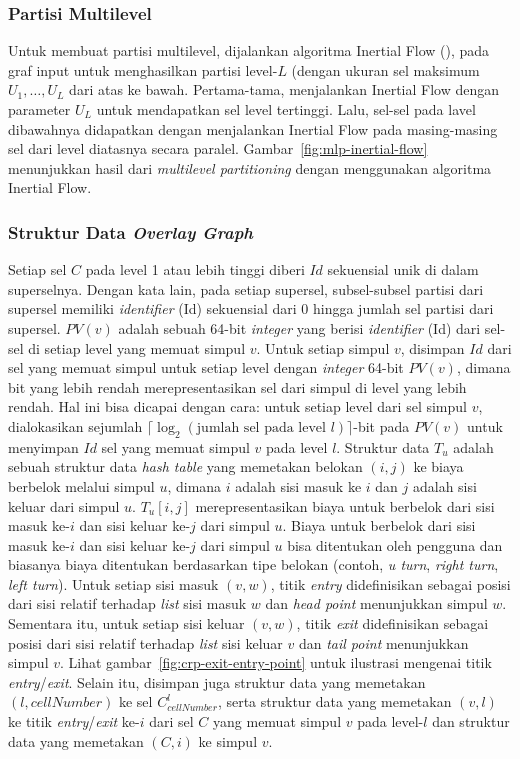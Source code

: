 \subsubsection{Partisi Multilevel}
\label{subsec:tdcrp-multilevel-partition}
 Untuk membuat partisi multilevel, dijalankan algoritma Inertial Flow (\cite{Schild2015}), pada graf input untuk menghasilkan partisi level-$L$ (dengan ukuran sel maksimum $U_1,\ldots, U_{L}$ dari atas ke bawah. Pertama-tama, menjalankan Inertial Flow dengan parameter $U_L$ untuk mendapatkan sel level tertinggi. Lalu, sel-sel pada lavel dibawahnya didapatkan dengan menjalankan Inertial Flow pada masing-masing sel dari level diatasnya secara paralel. Gambar~\ref{fig:mlp-inertial-flow} menunjukkan hasil dari \textit{multilevel partitioning} dengan menggunakan algoritma Inertial Flow.
 
 
\subsubsection{Struktur Data \textit{Overlay Graph}}
\label{subsec:tdcrp-datastructure}
 Setiap sel $C$ pada level 1 atau lebih tinggi diberi $Id$ sekuensial unik di dalam superselnya. Dengan kata lain, pada setiap supersel, subsel-subsel partisi dari supersel memiliki \textit{identifier} (Id) sekuensial dari 0 hingga jumlah sel partisi dari supersel. $PV(v)$ adalah sebuah 64-bit \textit{integer} yang berisi \textit{identifier} (Id) dari sel-sel di setiap level yang memuat simpul $v$. Untuk setiap simpul $v$, disimpan $Id$ dari sel yang memuat simpul untuk setiap level dengan \textit{integer} 64-bit $PV(v)$, dimana bit yang lebih rendah merepresentasikan sel dari simpul di level yang lebih rendah. Hal ini bisa dicapai dengan cara: untuk setiap level dari sel simpul $v$, dialokasikan sejumlah $\lceil \log_2(\text{jumlah sel pada level } l) \rceil$-bit pada $PV(v)$ untuk menyimpan $Id$ sel yang memuat simpul $v$ pada level $l$. Struktur data $T_u$ adalah sebuah struktur data \textit{hash table} yang memetakan belokan $(i,j)$ ke biaya berbelok melalui simpul $u$, dimana $i$ adalah sisi masuk ke $i$ dan $j$ adalah sisi keluar dari simpul $u$. $T_u[i,j]$ merepresentasikan biaya untuk berbelok dari sisi masuk ke-$i$ dan sisi keluar ke-$j$ dari simpul $u$. Biaya untuk berbelok dari sisi masuk ke-$i$ dan sisi keluar ke-$j$ dari simpul $u$ bisa ditentukan oleh pengguna dan biasanya biaya ditentukan berdasarkan tipe belokan (contoh, \textit{u turn}, \textit{right turn}, \textit{left turn}). Untuk setiap sisi masuk $(v,w)$, titik \textit{entry} didefinisikan sebagai posisi dari sisi relatif terhadap \textit{list} sisi masuk $w$ dan \textit{head point} menunjukkan simpul $w$. Sementara itu, untuk setiap sisi keluar $(v,w)$, titik \textit{exit} didefinisikan sebagai posisi dari sisi relatif terhadap \textit{list} sisi keluar $v$ dan \textit{tail point} menunjukkan simpul $v$. Lihat gambar~\ref{fig:crp-exit-entry-point} untuk ilustrasi mengenai titik \textit{entry}/\textit{exit}. Selain itu, disimpan juga struktur data yang memetakan $(l,cellNumber)$ ke sel $C_{cellNumber}^l$, serta struktur data yang memetakan $(v,l)$ ke titik \textit{entry}/\textit{exit} ke-$i$ dari sel $C$ yang memuat simpul $v$ pada level-$l$ dan struktur data yang memetakan $(C,i)$ ke simpul $v$.

